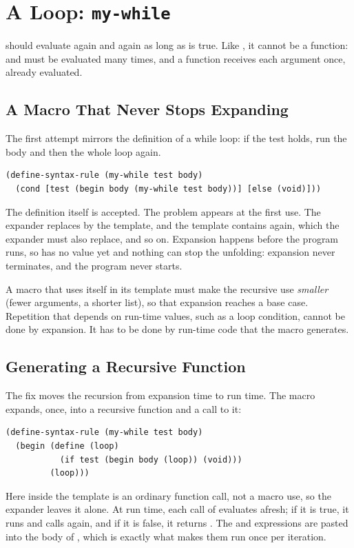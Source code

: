 \section{A Loop: \texttt{my-while}}
\label{sec:mywhile}

 should evaluate  again and again as long as  is true. Like , it cannot be a function:  and  must be evaluated many times, and a function receives each argument once, already evaluated.

\subsection{A Macro That Never Stops Expanding}

The first attempt mirrors the definition of a while loop: if the test holds, run the body and then the whole loop again.
\begin{lstlisting}
(define-syntax-rule (my-while test body)
  (cond [test (begin body (my-while test body))] [else (void)]))
\end{lstlisting}
The definition itself is accepted. The problem appears at the first use. The expander replaces  by the template, and the template contains  again, which the expander must also replace, and so on. Expansion happens before the program runs, so  has no value yet and nothing can stop the unfolding: expansion never terminates, and the program never starts.

\begin{keypoint}
A macro that uses itself in its template must make the recursive use \emph{smaller} (fewer arguments, a shorter list), so that expansion reaches a base case. Repetition that depends on run-time values, such as a loop condition, cannot be done by expansion. It has to be done by run-time code that the macro generates.
\end{keypoint}

\subsection{Generating a Recursive Function}

The fix moves the recursion from expansion time to run time. The macro expands, once, into a recursive function and a call to it:
\begin{lstlisting}
(define-syntax-rule (my-while test body)
  (begin (define (loop)
           (if test (begin body (loop)) (void)))
         (loop)))
\end{lstlisting}
Here  inside the template is an ordinary function call, not a macro use, so the expander leaves it alone. At run time, each call of  evaluates  afresh; if it is true, it runs  and calls  again, and if it is false, it returns . The  and  expressions are pasted into the body of , which is exactly what makes them run once per iteration.

